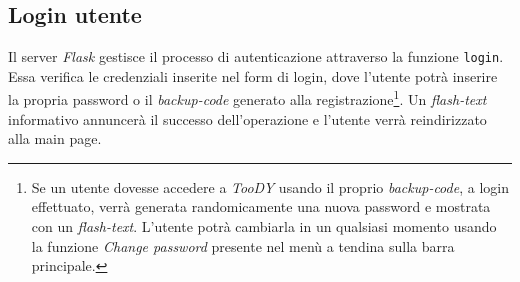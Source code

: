 \documentclass[12pt]{report}
\newcommand{\toody}{\textsl{TooDY}\xspace}
\newcommand{\flask}{\textsl{Flask}\xspace}
\begin{document}
\subsection{Login utente}
Il server \flask gestisce il processo di autenticazione attraverso la funzione \texttt{login}. Essa verifica le credenziali inserite nel form di login, dove l'utente potrà inserire la propria password o il \textit{backup-code} generato alla registrazione\footnote{Se un utente dovesse accedere a \toody usando il proprio \textit{backup-code}, a login effettuato, verrà generata randomicamente una nuova password e mostrata con un \textit{flash-text}. L'utente potrà cambiarla in un qualsiasi momento usando la funzione \textit{Change password} presente nel menù a tendina sulla barra principale.}. Un \textit{flash-text} informativo annuncerà il successo dell'operazione e l'utente verrà reindirizzato alla \textsf{main page}.
\end{document}
